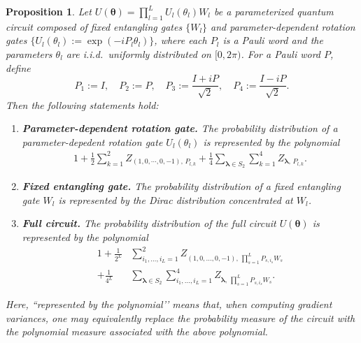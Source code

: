 \documentclass[%
 superscriptaddress,
 aps,prl,
 reprint,
 twocolumn,
 amsmath,amssymb,showpacs,
 bibnotes,
]{revtex4-2}
\newtheorem{proposition}{Proposition}
\newcommand{\RomanNumeralCaps}[1]
    {\MakeUppercase{\romannumeral #1}}
\begin{document}
\begin{proposition}
Let $U(\boldsymbol{\theta}) = \prod_{l=1}^{L} U_l(\theta_l) W_l$ be a parameterized quantum circuit composed of fixed entangling gates $\{W_l\}$ and parameter-dependent rotation gates $\{U_l(\theta_l) := \exp(-i P_l \theta_l)\}$, where each $P_l$ is a Pauli word and the parameters $\theta_l$ are i.i.d.\ uniformly distributed on $[0,2\pi)$. 
For a Pauli word $P$, define
\begin{equation}
    P_1 := I, \quad 
    P_2 := P, \quad 
    P_3 := \frac{I + iP}{\sqrt{2}}, \quad 
    P_4 := \frac{I - iP}{\sqrt{2}}.
\end{equation}
Then the following statements hold:
\begin{enumerate}
    \item \textbf{Parameter-dependent rotation gate.}  
    The probability distribution of a parameter-depedent rotation gate $U_l(\theta_l)$ is represented by the polynomial
    \begin{equation}
        \begin{aligned}
            1 + \frac{1}{2} \sum_{k=1}^2
            Z_{(1,0,\cdots,0,-1),\,P_{l,k}} + \frac{1}{4} 
            \sum_{\boldsymbol{\lambda}\in S_2}
            \sum_{k=1}^{4}
            Z_{\boldsymbol{\lambda},\,P_{l,k}}.
        \end{aligned}
        \label{eq:single}
    \end{equation}
    \item \textbf{Fixed entangling gate.}  
     The probability distribution of a fixed entangling gate $W_l$ is represented by the Dirac distribution concentrated at $W_l$.

    \item \textbf{Full circuit.}  
    The probability distribution of the full circuit $U(\boldsymbol{\theta})$ is represented by the polynomial
    \begin{equation}
        \begin{aligned}
            1 
            + \frac{1}{2^{L}} 
            &\sum_{i_1,\ldots,i_L=1}^{2} 
            Z_{(1,0,\ldots,0,-1),\,\prod_{s=1}^{L} P_{s,i_s}W_s}\\
            + \frac{1}{4^{L}} 
            &\sum_{\boldsymbol{\lambda}\in S_2}
            \sum_{i_1,\ldots,i_L=1}^{4} 
            Z_{\boldsymbol{\lambda},\,\prod_{s=1}^{L} P_{s,i_s} W_s}.
        \end{aligned}
     \end{equation}
\end{enumerate}
Here, “represented by the polynomial’’ means that, when computing gradient variances, one may equivalently replace the probability measure of the circuit with the polynomial measure associated with the above polynomial.
\label{prop:comp}
\end{proposition}
\end{document}
